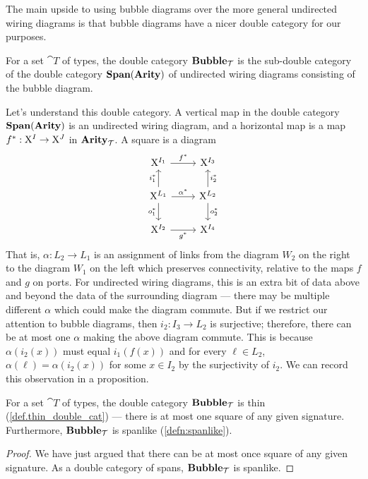 \documentclass[DynamicalBook]{subfiles}
\begin{document}
The main upside to using bubble diagrams over the more general undirected wiring diagrams is that bubble diagrams have a nicer double category for our purposes.
      \begin{definition}
        For a set $\cat{T}$ of types, the double category $\textbf{Bubble}_{{\mathcal{T}}}$ is the sub-double category of the double category $\textbf{Span}(\textbf{Arity})$ of undirected wiring diagrams consisting of the bubble diagram.
    \end{definition}

    Let's understand this double category. A vertical map in the double category $\textbf{Span}(\textbf{Arity})$ is an undirected wiring diagram, and a horizontal map is a map $f^{\ast} : \mathrm{X}^{I} \to \mathrm{X}^{J}$ in $\textbf{Arity}_{\mathcal{T}}$. A square is a diagram
    \[
\begin{tikzcd}
	{\XX^{I_1}} & {\XX^{I_3}} \\
	{\XX^{L_1}} & {\XX^{L_2}} \\
	{\XX^{I_2}} & {\XX^{I_4}}
	\arrow["{f^{\ast}}", from=1-1, to=1-2]
	\arrow["{g^{\ast}}"', from=3-1, to=3-2]
	\arrow["{\alpha^{\ast}}", from=2-1, to=2-2]
	\arrow["{i^{\ast}_1}", from=2-1, to=1-1]
	\arrow["{o^{\ast}_1}"', from=2-1, to=3-1]
	\arrow["{i^{\ast}_2}"', from=2-2, to=1-2]
	\arrow["{o^{\ast}_2}", from=2-2, to=3-2]
\end{tikzcd}
    \]
That is, $\alpha : L_{2} \to L_{1}$ is an assignment of links from the diagram $W_{2}$ on the right to the diagram $W_{1}$ on the left which preserves connectivity, relative to the maps $f$ and $g$ on ports. For undirected wiring diagrams, this is an extra bit of data above and beyond the data of the surrounding diagram --- there may be multiple different $\alpha$ which could make the diagram commute. But if we restrict our attention to bubble diagrams, then $i_{2} : I_{3} \to L_{2}$ is surjective; therefore, there can be at most one $\alpha$ making the above diagram commute. This is because $\alpha(i_{2}(x))$ must equal $i_{1}(f(x))$ and for every $\ell \in L_{2}$, $\alpha(\ell) = \alpha(i_{2}(x))$ for some $x \in I_{2}$ by the surjectivity of $i_{2}$. We can record this observation in a proposition.
\begin{proposition}\label{prop:bubble.diag.thin.spanlike}
  For a set $\cat{T}$ of types, the double category $\textbf{Bubble}_{{\mathcal{T}}}$ is thin (\cref{def.thin_double_cat}) --- there is at most one square of any given signature. Furthermore, $\textbf{Bubble}_{{\mathcal{T}}}$ is spanlike (\cref{defn:spanlike}).
\end{proposition}
\begin{proof}
We have just argued that there can be at most once square of any given signature. As a double category of spans, $\textbf{Bubble}_{\mathcal{T}}$ is spanlike.
  \end{proof}
\end{document}
